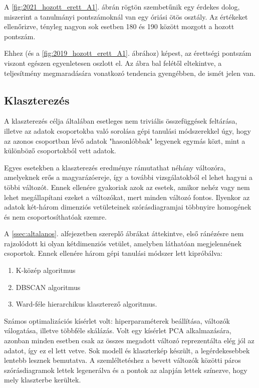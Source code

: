 \documentclass[12pt]{article}
\begin{document}
A \ref{fig:2021_hozott_erett_A1}. ábrán rögtön szembetűnik egy érdekes dolog, miszerint a tanulmányi pontszámoknál van egy óriási ötös osztály. Az értékeket ellenőrizve, tényleg nagyon sok esetben 180 és 190 között mozgott a hozott pontszám.

Ehhez (és a \ref{fig:2019_hozott_erett_A1}. ábrához) képest, az érettségi pontszám viszont egészen egyenletesen oszlott el. Az ábra bal felétől eltekintve, a teljesítmény megmaradására vonatkozó tendencia gyengébben, de ismét jelen van.


\subsection{Klaszterezés}

A klaszterezés célja általában esetleges nem triviális összefüggések feltárása, illetve az adatok csoportokba való sorolása gépi tanulási módszerekkel úgy, hogy az azonos csoportban lévő adatok "hasonlóbbak" legyenek egymás közt, mint a különböző csoportokból vett adatok.

Egyes esetekben a klaszterezés eredménye rámutathat néhány változóra, amelyeknek erős a magyarázóereje, így a további vizsgálatokból el lehet hagyni a többi változót. Ennek ellenére gyakoriak azok az esetek, amikor nehéz vagy nem lehet megállapítani ezeket a változókat, mert minden változó fontos. Ilyenkor az adatok két-három dimenziós vetületeinek szórásdiagramjai többnyire homogének és nem csoportosíthatóak szemre.

A \ref{ssec:altalanos}. alfejezetben szereplő ábrákat áttekintve, első ránézésre nem rajzolódott ki olyan kétdimenziós vetület, amelyben láthatóan megjelennének csoportok. Ennek ellenére három gépi tanulási módszer lett kipróbálva:
\begin{enumerate}
\item K-közép algoritmus
\item DBSCAN algoritmus
\item Ward-féle hierarchikus klaszterező algoritmus.
\end{enumerate}

Számos optimalizációs kísérlet volt: hiperparaméterek beállítása, változók válogatása, illetve többféle skálázás. Volt egy kísérlet PCA alkalmazására, azonban minden esetben csak az összes megadott változó reprezentálta elég jól az adatot, így ez el lett vetve. Sok modell és klaszterkép készült, a legérdekesebbek lentebb lesznek bemutatva. A szemléltetéshez a bevett változók közötti páros szórásdiagramok lettek legenerálva és a pontok az alapján lettek színezve, hogy mely klaszterbe kerültek.
\end{document}
